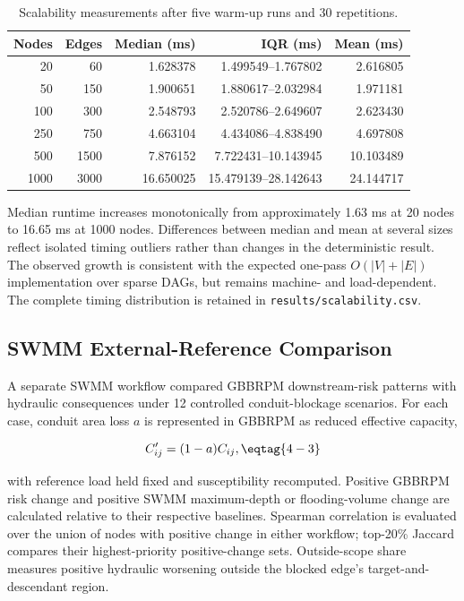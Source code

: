 \begin{table}[H]
\centering
\caption{Scalability measurements after five warm-up runs and 30 repetitions.}
\label{tab:scalability}
\small
\renewcommand{\arraystretch}{1.08}
\begin{tabular*}{\textwidth}{@{\extracolsep{\fill}}rrrrr@{}}
\toprule
Nodes & Edges & Median (ms) & IQR (ms) & Mean (ms) \\
\midrule
20   & 60   & 1.628378  & 1.499549--1.767802   & 2.616805 \\
50   & 150  & 1.900651  & 1.880617--2.032984   & 1.971181 \\
100  & 300  & 2.548793  & 2.520786--2.649607   & 2.623430 \\
250  & 750  & 4.663104  & 4.434086--4.838490   & 4.697808 \\
500  & 1500 & 7.876152  & 7.722431--10.143945  & 10.103489 \\
1000 & 3000 & 16.650025 & 15.479139--28.142643 & 24.144717 \\
\bottomrule
\end{tabular*}
\end{table}

Median runtime increases monotonically from approximately 1.63 ms at 20
nodes to 16.65 ms at 1000 nodes. Differences between median and mean at
several sizes reflect isolated timing outliers rather than changes in the
deterministic result. The observed growth is consistent with the expected
one-pass $O(|V|+|E|)$ implementation over sparse DAGs, but remains machine-
and load-dependent. The complete timing distribution is retained in
\texttt{results/scalability.csv}.

\subsection{SWMM External-Reference Comparison}

A separate SWMM workflow compared GBBRPM downstream-risk patterns with
hydraulic consequences under 12 controlled conduit-blockage scenarios.
For each case, conduit area loss $a$ is represented in GBBRPM as reduced
effective capacity,

\[
C'_{ij}=(1-a)C_{ij},
\eqtag{4-3}\]

with reference load held fixed and susceptibility recomputed. Positive
GBBRPM risk change and positive SWMM maximum-depth or flooding-volume
change are calculated relative to their respective baselines. Spearman
correlation is evaluated over the union of nodes with positive change in
either workflow; top-20\% Jaccard compares their highest-priority
positive-change sets. Outside-scope share measures positive hydraulic worsening
outside the blocked edge's target-and-descendant region.

